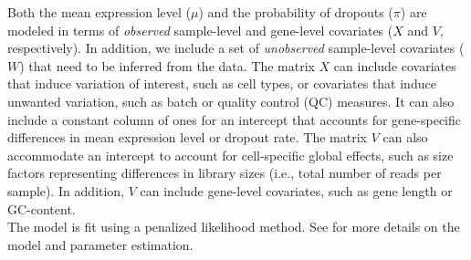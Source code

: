 \documentclass{bmcart}
\begin{document}
{Both the mean expression level ($\mu$) and the probability of dropouts ($\pi$) are modeled in terms of \textit{observed} sample-level and gene-level covariates ($X$ and $V$, respectively). In addition, we include a set of \textit{unobserved} sample-level covariates ($W$) that need to be inferred from the data. The matrix $X$ can include covariates that induce variation of interest, such as cell types, or covariates that induce unwanted variation, such as batch or quality control (QC) measures. It can also include a constant column of ones for an intercept that accounts for gene-specific differences in mean expression level or dropout rate. The matrix $V$ can also accommodate an intercept to account for cell-specific global effects, such as size factors representing differences in library sizes (i.e., total number of reads per sample). In addition, $V$ can include gene-level covariates, such as gene length or GC-content.\\ 

The model is fit using a penalized likelihood method. See \cite{Risso2017} for more details on the model and parameter estimation.}
\end{document}
